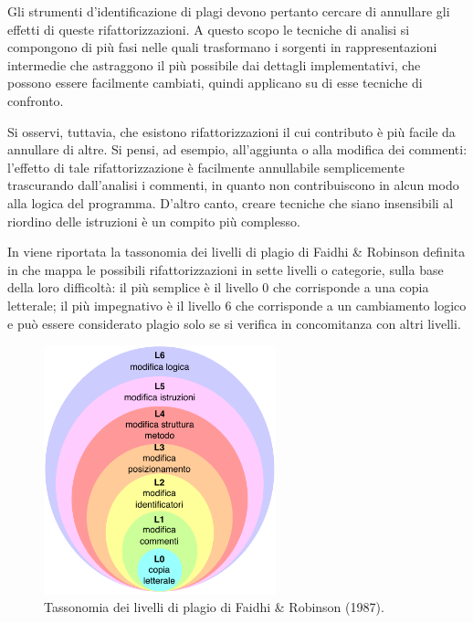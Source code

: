 Gli strumenti d'identificazione di plagi devono pertanto cercare di annullare gli effetti di queste rifattorizzazioni.
%
A questo scopo le tecniche di analisi si compongono di più fasi nelle quali trasformano i sorgenti in rappresentazioni intermedie che astraggono il più possibile dai dettagli implementativi, che possono essere facilmente cambiati, quindi applicano su di esse tecniche di confronto.

Si osservi, tuttavia, che esistono rifattorizzazioni il cui contributo è più facile da annullare di altre. 
%
Si pensi, ad esempio, all'aggiunta o alla modifica dei commenti: l'effetto di tale rifattorizzazione è facilmente annullabile semplicemente trascurando dall'analisi i commenti, in quanto non contribuiscono in alcun modo alla logica del programma. 
%
D'altro canto, creare tecniche che siano insensibili al riordino delle istruzioni è un compito più complesso.

In  viene riportata la tassonomia dei livelli di plagio di Faidhi \& Robinson definita in \cite{faidhi-robinson-1987} che mappa le possibili rifattorizzazioni in sette livelli o categorie, sulla base della loro difficoltà: il più semplice è il livello 0 che corrisponde a una copia letterale; il più impegnativo è il livello 6 che corrisponde a un cambiamento logico e può essere considerato plagio solo se si verifica in concomitanza con altri livelli.

\begin{figure}[h]
    \centering
    \includegraphics[width=0.6\textwidth]{resources/img/01-levels-of-plagiarism.pdf}
    \caption{Tassonomia dei livelli di plagio di Faidhi \& Robinson (1987).}
    \label{img:01-levels-of-plagiarism}
\end{figure}

